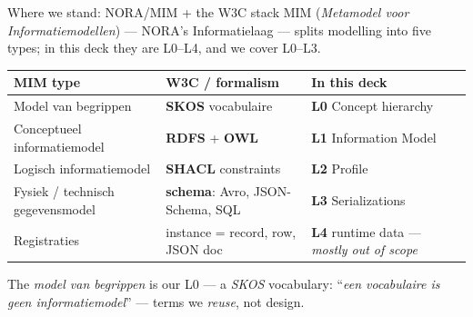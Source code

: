 \begin{frame}{Where we stand: NORA/MIM + the W3C stack}
	\small
	MIM (\emph{Metamodel voor Informatiemodellen}) — NORA's Informatielaag —
	splits modelling into five types; in this deck they are L0--L4, and we cover L0--L3.
	\vspace{0.3em}
	\footnotesize
	\setlength{\tabcolsep}{3pt}
	\begin{center}
	\begin{tabular}{@{}p{2.7cm}p{3.2cm}p{4.4cm}@{}}
		\toprule
		\textbf{MIM type} & \textbf{W3C / formalism} & \textbf{In this deck}\\
		\midrule
		Model van begrippen & \textbf{SKOS} vocabulaire & \textbf{L0} Concept hierarchy\\
		\midrule
		Conceptueel informatiemodel & \textbf{RDFS} + \textbf{OWL} & \textbf{L1} Information Model\\
		Logisch informatiemodel & \textbf{SHACL} constraints & \textbf{L2} Profile\\
		Fysiek / technisch gegevensmodel & \textbf{schema}: Avro, JSON-Schema, SQL & \textbf{L3} Serializations\\
		\midrule
		\color{gray}Registraties & \color{gray}instance = record, row, JSON doc & \color{gray}\textbf{L4} runtime data --- \emph{mostly out of scope}\\
		\bottomrule
	\end{tabular}
	\end{center}
	\vspace{0.3em}
	\small
	The \emph{model van begrippen} is our L0 — a \emph{SKOS} vocabulary:
	``\emph{een vocabulaire is geen informatiemodel}'' —
	terms we \emph{reuse}, not design.
\end{frame}
